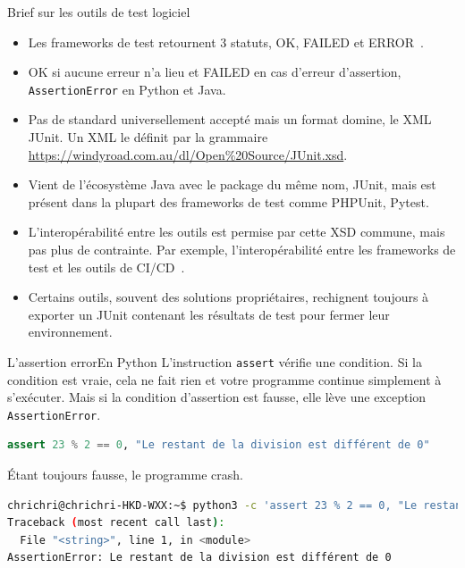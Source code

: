 \documentclass{beamer}
\begin{document}
    \begin{frame}{Brief sur les outils de test logiciel}
        \begin{itemize}
            \item Les frameworks de test retournent 3 statuts, OK, FAILED et ERROR~.

            \item OK si aucune erreur n’a lieu et FAILED en cas d’erreur d’assertion, \lstinline{AssertionError} en Python et Java.

            \item Pas de standard universellement accepté mais un format domine, le XML JUnit.
            Un XML le définit par la grammaire \url{https://windyroad.com.au/dl/Open\%20Source/JUnit.xsd}.

            \item Vient de l’écosystème Java avec le package du même nom, JUnit, mais est présent dans la plupart des frameworks de test comme PHPUnit, Pytest.

            \item L’interopérabilité entre les outils est permise par cette XSD commune, mais pas plus de contrainte.
            Par exemple, l’interopérabilité entre les frameworks de test et les outils de CI/CD~.

            \item Certains outils, souvent des solutions propriétaires, rechignent toujours à exporter un JUnit contenant les résultats de test pour fermer leur environnement.

        \end{itemize}
    \end{frame}


    \begin{frame}[fragile]{L'assertion error}{En Python}
        \transdissolve
        L’instruction \lstinline{assert} vérifie une condition.
        Si la condition est vraie, cela ne fait rien et votre programme continue simplement à s’exécuter.
        Mais si la condition d’assertion est fausse, elle lève une exception \lstinline{AssertionError}.
        \begin{lstlisting}[language=Python]
assert 23 % 2 == 0, "Le restant de la division est différent de 0"
        \end{lstlisting}
        Étant toujours fausse, le programme crash.
        \begin{lstlisting}[language=sh]
chrichri@chrichri-HKD-WXX:~$ python3 -c 'assert 23 % 2 == 0, "Le restant de la division est différent de 0"'
Traceback (most recent call last):
  File "<string>", line 1, in <module>
AssertionError: Le restant de la division est différent de 0
        \end{lstlisting}
    \end{frame}
\end{document}
